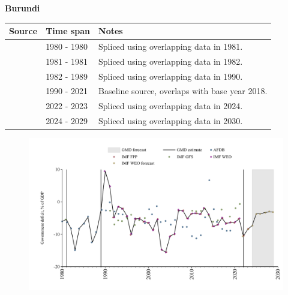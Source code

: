\documentclass[12pt,a4paper,landscape]{article}
\begin{document}
\begin{adjustbox}{max totalsize={\paperwidth}{\paperheight},center}
\begin{minipage}[t][\textheight][t]{\textwidth}
\vspace*{0.5cm}
{}
\begin{center}
{\Large\bfseries Burundi}
\end{center}
\vspace{0.5cm}
\begin{table}[H]
\centering
\small
\begin{tabular}{|l|l|l|}
\hline
\textbf{Source} & \textbf{Time span} & \textbf{Notes} \\
\hline
\rowcolor{white}\cite{AFDB}& 1980 - 1980 &Spliced using overlapping data in 1981.\\
\rowcolor{lightgray}\cite{IMF_GFS}& 1981 - 1981 &Spliced using overlapping data in 1982.\\
\rowcolor{white}\cite{AFDB}& 1982 - 1989 &Spliced using overlapping data in 1990.\\
\rowcolor{lightgray}\cite{IMF_WEO}& 1990 - 2021 &Baseline source, overlaps with base year 2018.\\
\rowcolor{white}\cite{IMF_FPP}& 2022 - 2023 &Spliced using overlapping data in 2024.\\
\rowcolor{lightgray}\cite{IMF_WEO_forecast}& 2024 - 2029 &Spliced using overlapping data in 2030.\\
\hline
\end{tabular}
\end{table}
\begin{figure}[H]
\centering
\includegraphics[width=\textwidth,height=0.6\textheight,keepaspectratio]{graphs/BDI_govdef_GDP.pdf}
\end{figure}
\end{minipage}
\end{adjustbox}
\end{document}
